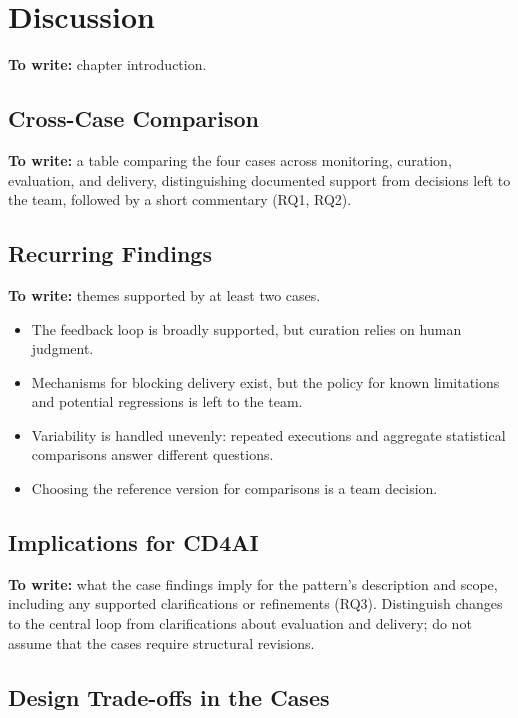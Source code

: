\chapter{Discussion}
\label{chap:discussion}

\textbf{To write:} chapter introduction.

\section{Cross-Case Comparison}
\label{sec:discussion-comparison}

\textbf{To write:} a table comparing the four cases across monitoring,
curation, evaluation, and delivery, distinguishing documented support from
decisions left to the team, followed by a short commentary (RQ1, RQ2).

\section{Recurring Findings}
\label{sec:discussion-findings}

\textbf{To write:} themes supported by at least two cases.

\begin{itemize}
  \item The feedback loop is broadly supported, but curation relies on human
    judgment.
  \item Mechanisms for blocking delivery exist, but the policy for known
    limitations and potential regressions is left to the team.
  \item Variability is handled unevenly: repeated executions and aggregate
    statistical comparisons answer different questions.
  \item Choosing the reference version for comparisons is a team decision.
\end{itemize}

\section{Implications for CD4AI}
\label{sec:discussion-implications}

\textbf{To write:} what the case findings imply for the pattern's description
and scope, including any supported clarifications or refinements (RQ3).
Distinguish changes to the central loop from clarifications about evaluation
and delivery; do not assume that the cases require structural revisions.

\section{Design Trade-offs in the Cases}
\label{sec:discussion-tradeoffs}

